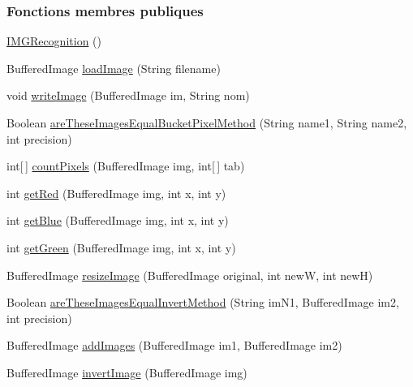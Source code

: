\subsubsection*{Fonctions membres publiques}
\begin{DoxyCompactItemize}
\item 
\hyperlink{classSushis_1_1src_1_1IMGRecognition_a3e643391bca697087339219b2ed8e2b1}{I\+M\+G\+Recognition} ()
\item 
Buffered\+Image \hyperlink{classSushis_1_1src_1_1IMGRecognition_a4bda2ca4d0b148344c08a8cc392a8de2}{load\+Image} (String filename)
\item 
void \hyperlink{classSushis_1_1src_1_1IMGRecognition_a6b81e073262c0a3aba8cd5adacdc24c0}{write\+Image} (Buffered\+Image im, String nom)
\item 
Boolean \hyperlink{classSushis_1_1src_1_1IMGRecognition_aa23d51110d018fd7f6fa7bb6070c7005}{are\+These\+Images\+Equal\+Bucket\+Pixel\+Method} (String name1, String name2, int precision)
\item 
int\mbox{[}$\,$\mbox{]} \hyperlink{classSushis_1_1src_1_1IMGRecognition_a57521884f4791a8414bafcaaf2e5a2cf}{count\+Pixels} (Buffered\+Image img, int\mbox{[}$\,$\mbox{]} tab)
\item 
int \hyperlink{classSushis_1_1src_1_1IMGRecognition_a0b9590573b448f8cca730f5e827af4b1}{get\+Red} (Buffered\+Image img, int x, int y)
\item 
int \hyperlink{classSushis_1_1src_1_1IMGRecognition_a26b781582f2f88a53a32d2fce1d99f06}{get\+Blue} (Buffered\+Image img, int x, int y)
\item 
int \hyperlink{classSushis_1_1src_1_1IMGRecognition_a920a76c8c0ab2d709b0dfac93ffb4000}{get\+Green} (Buffered\+Image img, int x, int y)
\item 
Buffered\+Image \hyperlink{classSushis_1_1src_1_1IMGRecognition_aa7fb8c8dad7f7ae03b4fea4018b4e5d3}{resize\+Image} (Buffered\+Image original, int new\+W, int new\+H)
\item 
Boolean \hyperlink{classSushis_1_1src_1_1IMGRecognition_a28191e9c0104ffbb4b8d8d4f227b86d3}{are\+These\+Images\+Equal\+Invert\+Method} (String im\+N1, Buffered\+Image im2, int precision)
\item 
Buffered\+Image \hyperlink{classSushis_1_1src_1_1IMGRecognition_aadd17798938319f748d76558a5cb74d8}{add\+Images} (Buffered\+Image im1, Buffered\+Image im2)
\item 
Buffered\+Image \hyperlink{classSushis_1_1src_1_1IMGRecognition_acebcc87d32e418a7122dff9d0ad5dfac}{invert\+Image} (Buffered\+Image img)

\end{DoxyCompactItemize}
